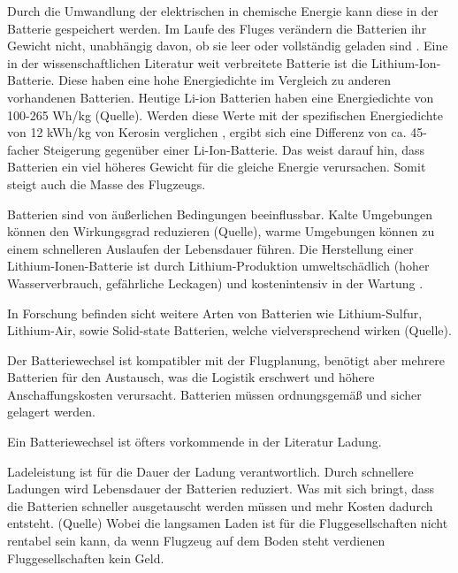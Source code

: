 Durch die Umwandlung der elektrischen in chemische Energie kann diese in der Batterie gespeichert werden.
Im Laufe des Fluges verändern die Batterien ihr Gewicht nicht, unabhängig davon, ob sie leer oder vollständig geladen sind \cite{donckers2024electric}. 
Eine in der wissenschaftlichen Literatur weit verbreitete Batterie ist die Lithium-Ion-Batterie. Diese haben eine hohe Energiedichte im Vergleich zu anderen vorhandenen Batterien. %
Heutige Li-ion Batterien haben eine Energiedichte von 100-265 Wh/kg (Quelle). Werden diese Werte mit der spezifischen Energiedichte von 12 kWh/kg von Kerosin verglichen \cite{dalmia2022powering},
ergibt sich eine Differenz von ca. 45-facher Steigerung gegenüber einer Li-Ion-Batterie. Das weist darauf hin, dass Batterien ein viel höheres Gewicht für die gleiche Energie verursachen. 
Somit steigt auch die Masse des Flugzeugs.

Batterien sind von äußerlichen Bedingungen beeinflussbar. Kalte Umgebungen können 
den Wirkungsgrad reduzieren (Quelle), warme Umgebungen können zu einem schnelleren Auslaufen der Lebensdauer führen.
Die Herstellung einer Lithium-Ionen-Batterie ist durch Lithium-Produktion umweltschädlich (hoher Wasserverbrauch, gefährliche Leckagen) und 
kostenintensiv in der Wartung \cite{dalmia2022powering}. 

In Forschung befinden sicht weitere Arten von Batterien wie Lithium-Sulfur, Lithium-Air, sowie Solid-state Batterien, welche vielversprechend wirken (Quelle).
%
%

Der Batteriewechsel ist kompatibler mit der Flugplanung, benötigt aber mehrere Batterien für den Austausch, was die Logistik erschwert 
und höhere Anschaffungskosten verursacht. Batterien müssen ordnungsgemäß und sicher gelagert werden. \cite{salucci2020optimal}

Ein Batteriewechsel ist öfters vorkommende in der Literatur Ladung.

Ladeleistung ist für die Dauer der Ladung verantwortlich. Durch schnellere Ladungen wird Lebensdauer der Batterien reduziert. Was mit sich bringt, dass die Batterien schneller ausgetauscht werden müssen
und mehr Kosten dadurch entsteht. (Quelle) Wobei die langsamen Laden ist für die Fluggesellschaften nicht rentabel sein kann, 
da wenn Flugzeug auf dem Boden steht verdienen Fluggesellschaften kein Geld.

